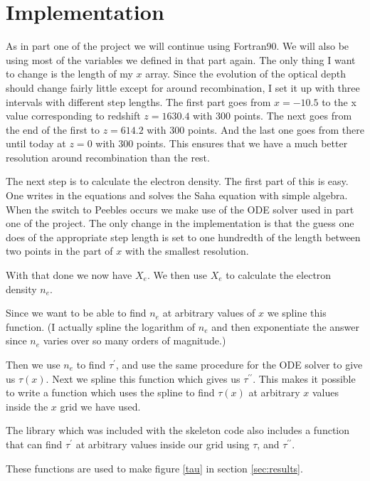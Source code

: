 \documentclass{aa}   %
\begin{document}
\section{Implementation}\label{sec:Imp}
As in part one of the project we will continue using Fortran90.
We will also be using most of the variables we defined in that part again.
The only thing I want to change is the length of my $x$ array. 
Since the evolution of the optical depth should change fairly little except for around recombination, I set it up with three intervals with different step lengths. The first part goes from $x = -10.5$ to the x value corresponding to redshift $z= 1630.4$ with 300 points. The next goes from the end of the first to $z = 614.2$ with 300 points. And the last one goes from there until today at $z = 0$ with 300 points. This ensures that we have a much better resolution around recombination than the rest.

The next step is to calculate the electron density. The first part of this is easy. One writes in the equations and solves the Saha equation with simple algebra. When the switch to Peebles occurs we make use of the ODE solver used in part one of the project. The only change in the implementation is that the guess one does of the appropriate step length is set to one hundredth of the length between two points in the part of $x$ with the smallest resolution. 

With that done we now have $X_e$.
We then use $X_e$ to calculate the electron density $n_e$.

Since we want to be able to find $n_e$ at arbitrary values of $x$ we spline this function. (I actually spline the logarithm of $n_e$ and then exponentiate the answer since $n_e$ varies over so many orders of magnitude.)

Then we use $n_e$ to find $\tau^\prime$, and use the same procedure for the ODE solver to give us $\tau(x)$. Next we spline this function which gives us $\tau^{\prime\prime}$. This makes it possible to write a function which uses the spline to find $\tau(x)$ at arbitrary $x$ values inside the $x$ grid we have used. 

The library which was included with the skeleton code also includes a function that can find $\tau^\prime$ at arbitrary values inside our grid using $\tau$, and $\tau^{\prime\prime}$.

These functions are used to make figure \ref{tau} in section \ref{sec:results}.
\end{document}
